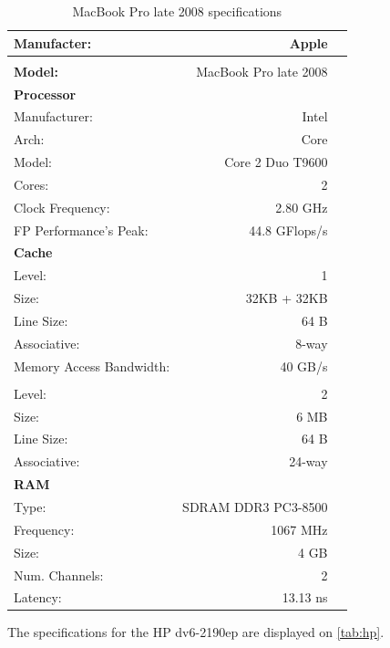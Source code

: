 \documentclass[a4paper,10pt,openright,openbib,twocolumn]{article}
\begin{document}
\tabcolsep=0.11cm
\begin{table}[!htp]
	\footnotesize
		\begin{tabular}{lrl}
			\hline 
			\textbf{Manufacter:} & Apple \\
			\hline \\
			\textbf{Model:} & MacBook Pro late 2008 \\
			\hline 
			\textbf{Processor} & & \\
			Manufacturer: & Intel & \\
			Arch: & Core & \\
			Model: & Core 2 Duo T9600 & \\
			Cores: & 2 & \\
			Clock Frequency: & 2.80 GHz & \\
			FP Performance's Peak: & 44.8 GFlops/s & \\
			\hline 
			\textbf{Cache} & & \\
			Level: & 1 & \\
			Size: & 32KB + 32KB & \\
			Line Size: & 64 B & \\
			Associative: & 8-way & \\
			Memory Access Bandwidth: & 40 GB/s & \\
			\\
			Level: & 2 & \\
			Size: & 6 MB & \\
			Line Size: & 64 B & \\
			Associative: & 24-way & \\
			\hline 
			\textbf{RAM} \\
			Type: & SDRAM DDR3 PC3-8500 & \\
			Frequency: & 1067 MHz & \\
			Size: & 4 GB & \\
			Num. Channels: & 2 & \\
			Latency: & 13.13 ns & \\
		\end{tabular}
		\caption{MacBook Pro late 2008 specifications}
		\label{tab:mbp}
\end{table}
The specifications for the HP dv6-2190ep are displayed on \autoref{tab:hp}. \\
\end{document}
